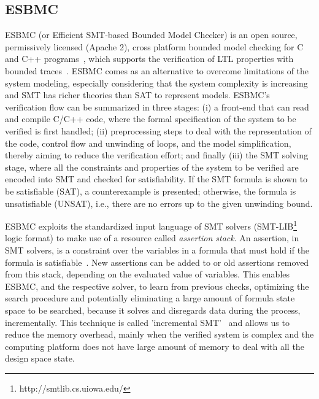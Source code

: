 \documentclass[runningheads]{llncs}
\begin{document}
\subsection{ESBMC}

ESBMC (or Efficient SMT-based Bounded Model Checker) is an open source, permissively licensed (Apache 2), cross platform bounded model checking for C and C++ programs~\cite{esbmc2018}, which supports the verification of LTL properties with bounded traces~\cite{DBLP:journals/sosym/MorseCN015}. 
ESBMC comes as an alternative to overcome limitations of the system modeling, especially considering that the system complexity is increasing and SMT has richer theories than SAT to represent models. 
%
ESBMC's verification flow can be summarized in three stages: (i) a front-end that can read and compile C/C++ code, where the formal specification of the system to be verified is first handled; (ii) preprocessing steps to deal with the representation of the code, control flow and unwinding of loops, and the model simplification, thereby aiming to reduce the verification effort; and finally (iii) the SMT solving stage, where all the constraints and properties of the system to be verified are encoded into SMT and checked for satisfiability.
If the SMT formula is shown to be satisfiable (SAT), a counterexample is presented; otherwise, the formula is unsatisfiable (UNSAT), i.e., there are no errors up to the given unwinding bound. 

ESBMC exploits the standardized input language of SMT solvers (SMT-LIB\footnote{http://smtlib.cs.uiowa.edu/} logic format) to make use of a resource called \textit{assertion stack}. An assertion, in SMT solvers, is a constraint over the variables in a formula that must hold if the formula is satisfiable~\cite{Morse2015}. New assertions can be added to or old assertions removed from this stack, depending on the evaluated value of variables. This enables ESBMC, and the respective solver, to learn from previous checks, optimizing the search procedure and potentially eliminating a large amount of formula state space to be searched, because it solves and disregards data during the process, incrementally. This technique is called 'incremental SMT'~\cite{DBLP:journals/fac/SchrammelKBMTB17} and allows us to reduce the memory overhead, mainly when the verified system is complex and the computing platform does not have large amount of memory to deal with all the design space state.
\end{document}
